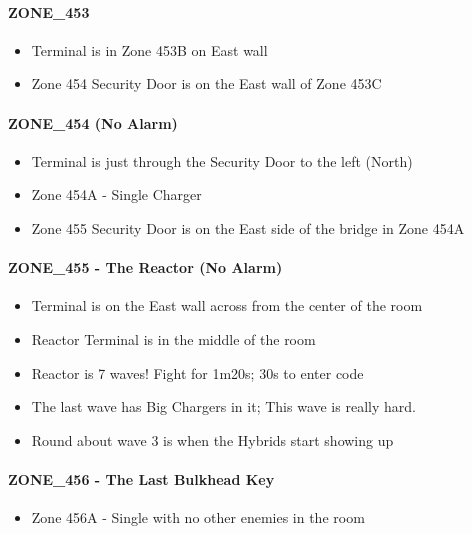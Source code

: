 \paragraph{ZONE\_453}
\begin{itemize}
    \item Terminal is in Zone 453B on East wall
    \item Zone 454 Security Door is on the East wall of Zone 453C
\end{itemize}

\paragraph{ZONE\_454 (No Alarm)}
\begin{itemize}
    \item Terminal is just through the Security Door to the left (North)
    \item Zone 454A - Single Charger \gtfoenemyscout{}
    \item Zone 455 Security Door is on the East side of the bridge in Zone 454A
\end{itemize}

\paragraph{ZONE\_455 - The Reactor (No Alarm)}
\begin{itemize}
    \item Terminal is on the East wall across from the center of the room
    \item Reactor Terminal is in the middle of the room
    \item Reactor is 7 waves!  Fight for 1m20s; 30s to enter code
    \item The last wave has Big Chargers in it; This wave is really hard.
    \item Round about wave 3 is when the Hybrids start showing up
\end{itemize}

\paragraph{ZONE\_456 - The Last Bulkhead Key}
\begin{itemize}
    \item Zone 456A - Single \gtfoenemyscout{} with no other enemies in the room
\end{itemize}
